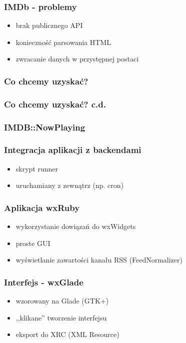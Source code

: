 \documentclass[12t]{beamer}
\begin{document}
\begin{frame}
  \frametitle{IMDb - problemy}
  \begin{itemize}
  \item brak publicznego API
  \item konieczność parsowania HTML
  \item zwracanie danych w przystępnej postaci
  \end{itemize}
\end{frame}

\begin{frame}[fragile]
  \frametitle{Co chcemy uzyskać?}
  
\end{frame}

\begin{frame}[fragile]
  \frametitle{Co chcemy uzyskać? c.d.}
  
\end{frame}

\begin{frame}[fragile]
  \frametitle{IMDB::NowPlaying}
  \begin{footnotesize}
    
  \end{footnotesize}
\end{frame}

\begin{frame}[fragile]
  \frametitle{Integracja aplikacji z backendami}
  \begin{itemize}
  \item skrypt runner
  \item uruchamiany z zewnątrz (np. cron)
  \end{itemize}
\end{frame}

\begin{frame}
  \frametitle{Aplikacja wxRuby}
  \begin{itemize}
  \item wykorzystanie dowiązań do wxWidgets
  \item proste GUI
  \item wyświetlanie zawartości kanału RSS (FeedNormalizer)
  \end{itemize}
\end{frame}

\begin{frame}
  \frametitle{Interfejs - wxGlade}
  \begin{itemize}
  \item wzorowany na Glade (GTK+)
  \item ,,klikane'' tworzenie interfejsu
  \item eksport do XRC (XML Resource)
  \end{itemize}
\end{frame}
\end{document}
